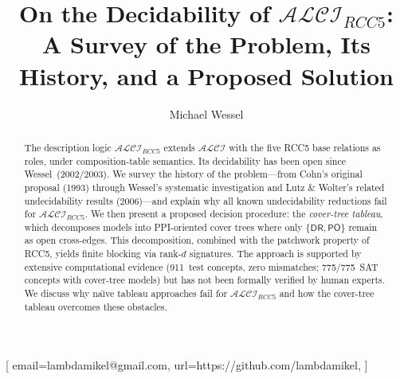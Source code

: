 \documentclass[
]{ceurart}
\theoremstyle{definition}
\newcommand{\ALCI}{\ensuremath{\mathcal{ALCI}}}
\newcommand{\ALCIRCC}[1]{\ensuremath{\mathcal{ALCI}_{\mathit{RCC#1}}}}
\newcommand{\DR}{\ensuremath{\mathsf{DR}}}
\newcommand{\PO}{\ensuremath{\mathsf{PO}}}
\begin{document}

\makeatletter
\providecommand\ceurConference@name{}
\makeatother

\title{On the Decidability of $\ALCIRCC{5}$:
  A Survey of the Problem, Its History, and a Proposed Solution}
\makeatletter
{}
\makeatother

\author[1]{Michael Wessel}[%
email=lambdamikel@gmail.com,
url=https://github.com/lambdamikel,
]
\cormark[1]
\address[1]{LambdaMikel@Home}


\begin{abstract}
The description logic $\ALCIRCC{5}$ extends $\ALCI$ with the five
RCC5 base relations as roles, under composition-table semantics.
Its decidability has been open since Wessel~(2002/2003).
We survey the history of the problem---from Cohn's original proposal
(1993) through Wessel's systematic investigation and Lutz \& Wolter's
related undecidability results (2006)---and explain why all known
undecidability reductions fail for $\ALCIRCC{5}$.
We then present a proposed decision procedure: the \emph{cover-tree
tableau}, which decomposes models into PPI-oriented cover trees
where only $\{\DR,\PO\}$ remain as open cross-edges.
This decomposition, combined with the patchwork property of RCC5,
yields finite blocking via rank-$d$ signatures.
The approach is supported by extensive computational evidence
(911~test concepts, zero mismatches; 775/775~SAT concepts with
cover-tree models) but has not been formally verified by human experts.
We discuss why na\"{\i}ve tableau approaches fail for
$\ALCIRCC{5}$ and how the cover-tree tableau overcomes these obstacles.
\end{abstract}
\end{document}

